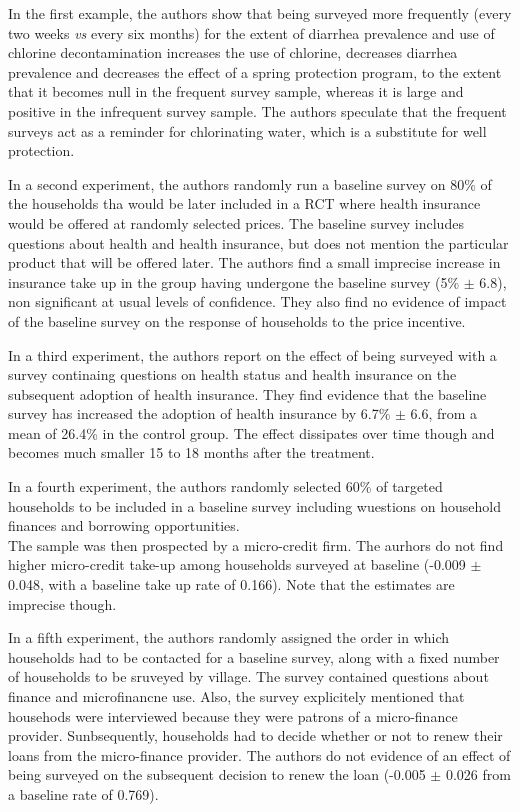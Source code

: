 \documentclass[]{book}
\theoremstyle{definition}
\theoremstyle{definition}
\theoremstyle{definition}
\theoremstyle{remark}
\begin{document}
In the first example, the authors show that being surveyed more
frequently (every two weeks \emph{vs} every six months) for the extent
of diarrhea prevalence and use of chlorine decontamination increases the
use of chlorine, decreases diarrhea prevalence and decreases the effect
of a spring protection program, to the extent that it becomes null in
the frequent survey sample, whereas it is large and positive in the
infrequent survey sample. The authors speculate that the frequent
surveys act as a reminder for chlorinating water, which is a substitute
for well protection.

In a second experiment, the authors randomly run a baseline survey on
80\% of the households tha would be later included in a RCT where health
insurance would be offered at randomly selected prices. The baseline
survey includes questions about health and health insurance, but does
not mention the particular product that will be offered later. The
authors find a small imprecise increase in insurance take up in the
group having undergone the baseline survey (5\% \(\pm\) 6.8), non
significant at usual levels of confidence. They also find no evidence of
impact of the baseline survey on the response of households to the price
incentive.

In a third experiment, the authors report on the effect of being
surveyed with a survey continaing questions on health status and health
insurance on the subsequent adoption of health insurance. They find
evidence that the baseline survey has increased the adoption of health
insurance by 6.7\% \(\pm\) 6.6, from a mean of 26.4\% in the control
group. The effect dissipates over time though and becomes much smaller
15 to 18 months after the treatment.

In a fourth experiment, the authors randomly selected 60\% of targeted
households to be included in a baseline survey including wuestions on
household finances and borrowing opportunities.\\
The sample was then prospected by a micro-credit firm. The aurhors do
not find higher micro-credit take-up among households surveyed at
baseline (-0.009 \(\pm\) 0.048, with a baseline take up rate of 0.166).
Note that the estimates are imprecise though.

In a fifth experiment, the authors randomly assigned the order in which
households had to be contacted for a baseline survey, along with a fixed
number of households to be sruveyed by village. The survey contained
questions about finance and microfinancne use. Also, the survey
explicitely mentioned that househods were interviewed because they were
patrons of a micro-finance provider. Sunbsequently, households had to
decide whether or not to renew their loans from the micro-finance
provider. The authors do not evidence of an effect of being surveyed on
the subsequent decision to renew the loan (-0.005 \(\pm\) 0.026 from a
baseline rate of 0.769).
\end{document}
